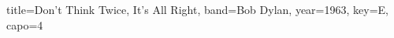 \documentclass{skrul-leadsheet}
\begin{document}
\begin{song}[transpose-capo=true]{title={Don't Think Twice, It's All Right}, band={Bob Dylan}, year={1963}, key={E}, capo={4}}



\end{song}
\end{document}
